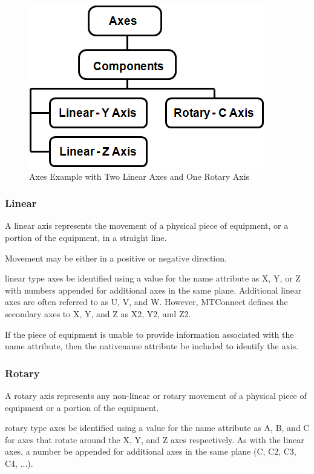 \begin{figure}[ht]
  \centering
  \includegraphics[width=.5\textwidth]{figures/axes-example-two-linear-one-rotary.png}
  \caption{Axes Example with Two Linear Axes and One Rotary Axis}
  \label{fig:axes-example-two-linear-one-rotary}
\end{figure}

\FloatBarrier

\subsubsection{Linear}

A \gls{linear} axis represents the movement of a physical piece of equipment, or a portion of the equipment, in a straight line.

Movement may be either in a positive or negative direction.

\gls{linear} type axes \must be identified using a value for the name attribute as X, Y, or Z with numbers appended for additional axes in the same plane.  Additional linear axes are often referred to as U, V, and W.   However, MTConnect defines the secondary axes to X, Y, and Z as X2, Y2, and Z2.

If the piece of equipment is unable to provide information associated with the \gls{name} attribute, then the \gls{nativename} attribute \must be included to identify the axis.

\subsubsection{Rotary}

A \gls{rotary} axis represents any non-linear or rotary movement of a physical piece of equipment or a portion of the equipment.

\gls{rotary} type axes \must be identified using a value for the \gls{name} attribute as A, B, and C for axes that rotate around the X, Y, and Z axes respectively.  As with the \gls{linear} axes, a number \must be appended for additional axes in the same plane (C, C2, C3, C4, ...).

